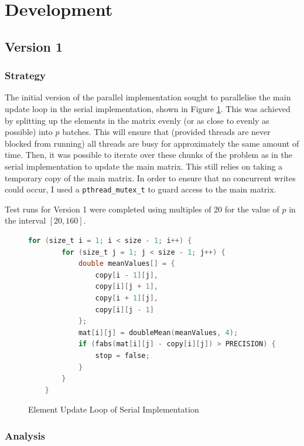 \section{Development}

\subsection{Version 1}

\subsubsection{Strategy}

The initial version of the parallel implementation sought to parallelise the main update loop in the serial implementation, shown in Figure \ref{fig:serialloop}. This was achieved by splitting up the elements in the matrix evenly (or as close to evenly as possible) into $p$ batches. This will ensure that (provided threads are never blocked from running) all threads are busy for approximately the same amount of time. Then, it was possible to iterate over these chunks of the problem as in the serial implementation to update the main matrix. This still relies on taking a temporary copy of the main matrix. In order to ensure that no concurrent writes could occur, I used a \texttt{pthread\_mutex\_t} to guard access to the main matrix.

Test runs for Version 1 were completed using multiples of 20 for the value of $p$ in the interval $[20, 160]$.

\begin{figure}[H]
    \centering
    \begin{lstlisting}[language=C]
    for (size_t i = 1; i < size - 1; i++) {
        for (size_t j = 1; j < size - 1; j++) {
            double meanValues[] = {
                copy[i - 1][j],
                copy[i][j + 1],
                copy[i + 1][j],
                copy[i][j - 1]
            };
            mat[i][j] = doubleMean(meanValues, 4);
            if (fabs(mat[i][j] - copy[i][j]) > PRECISION) {
                stop = false;
            }
        }
    }
    \end{lstlisting}
    \caption{Element Update Loop of Serial Implementation}
    \label{fig:serialloop}
\end{figure}

\subsubsection{Analysis} \label{v1results}

